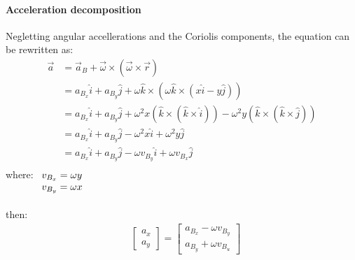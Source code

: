 \documentclass[12pt]{article}
\begin{document}
            \paragraph{Acceleration decomposition}
            Negletting angular accellerations and the Coriolis components, the equation can be rewritten as:
            \begin{equation}
                \begin{aligned}
                    \vec{a} & = \vec{a}_B + \vec{\omega} \times (\vec{\omega} \times \vec{r}) \\
                    & = a_{B_x} \hat{i} + a_{B_y} \hat{j} + \omega \hat{k} \times (\omega \hat{k} \times (x \hat{i} - y \hat{j})) \\
                    & = a_{B_x} \hat{i} + a_{B_y} \hat{j} + \omega^2 x (\hat{k} \times (\hat{k} \times \hat{i})) - \omega^2 y (\hat{k} \times (\hat{k} \times \hat{j})) \\
                    & = a_{B_x} \hat{i} + a_{B_y} \hat{j} - \omega^2 x \hat{i} + \omega^2 y \hat{j} \\
                    & = a_{B_x} \hat{i} + a_{B_y} \hat{j} - \omega v_{B_y} \hat{i} + \omega v_{B_x} \hat{j} \\
                \end{aligned}
            \end{equation}
            where:  $ \begin{array}[t]{l}
                        v_{B_x} = \omega y \\
                        v_{B_y} = \omega x \\
                    \end{array} $ \\
                \\
            then:
            \begin{equation}
                \label{accelleration in body frame}
                \begin{aligned}
                    & \begin{bmatrix} a_{x} \\ a_{y} \end{bmatrix}
                    = \begin{bmatrix} a_{B_x} - \omega v_{B_y} \\ a_{B_y} + \omega v_{B_u} \end{bmatrix} \\
                \end{aligned}
            \end{equation}
\end{document}

